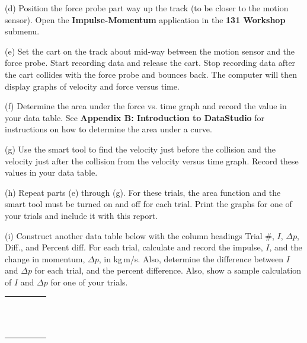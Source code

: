 (d) Position the force probe part way up the track (to be closer to the motion sensor). Open the \textbf{Impulse-Momentum} application in the \textbf{131 Workshop} submenu. 

(e) Set the cart on the track about mid-way between the motion sensor and the force probe. Start recording data and release the cart. Stop recording data after the cart collides with the force probe and bounces back. The computer will then display graphs of velocity and force versus time.

(f) Determine the area under the force vs. time graph and record the value in
your data table. See \textbf{Appendix B: Introduction to DataStudio} for instructions on how to determine the area under a curve.

(g) Use the smart tool to find the velocity just before the collision and the
velocity just after the collision from the velocity versus time graph. Record
these values in your data table.

(h) Repeat parts (e) through (g). For these trials, 
the area function and the smart tool must be turned on and off for each trial. 
Print the graphs for one of your trials and include it with this report.

\newpage

(i) Construct another data table below with the column headings
Trial \#, $I$, \( \Delta  p\), Diff., and Percent diff. For each trial, calculate and record
the impulse, $I$, and the change in momentum, \( \Delta  p\), in kg\,m/s. Also,
determine the difference between $I$ and $\Delta p$  for each trial, and the percent difference. Also, show a sample
calculation of $I$ and \( \Delta  p\) for one of your trials.

\begin{center}
\begin{tabular}{|p{1.0in}|p{1.0in}|p{1.0in}|p{1.0in}|p{1.0in}|} \hline
 & & & & \\ \hline
 & & & & \\
 & & & & \\
 & & & & \\
 & & & & \\
 & & & & \\
 & & & & \\
 & & & & \\
 & & & & \\
 & & & & \\
 & & & & \\
 & & & & \\
 & & & & \\
 & & & & \\ \hline
\end{tabular}
\end{center}

